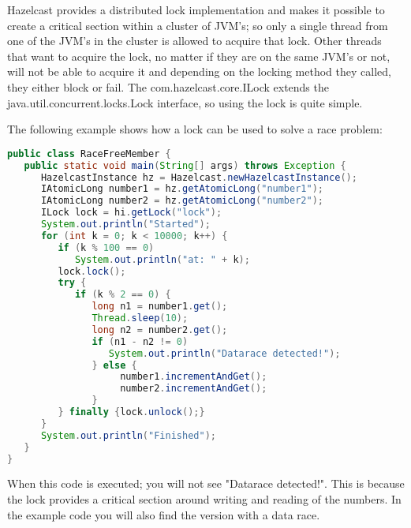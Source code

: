 Hazelcast provides a distributed lock implementation and makes it possible to create a critical section within a cluster of JVM's; so only a single thread from one of the JVM's in the cluster is allowed to acquire that lock. Other threads that want to acquire the lock, no matter if they are on the same JVM's or not, will not be able to acquire it and depending on the locking method they called, they either block or fail. The com.hazelcast.core.ILock extends the java.util.concurrent.locks.Lock interface, so using the lock is quite simple.

The following example shows how a lock can be used to solve a race problem:
\begin{lstlisting}[language=java]
public class RaceFreeMember {
   public static void main(String[] args) throws Exception {
      HazelcastInstance hz = Hazelcast.newHazelcastInstance();
      IAtomicLong number1 = hz.getAtomicLong("number1");
      IAtomicLong number2 = hz.getAtomicLong("number2");
      ILock lock = hi.getLock("lock");
      System.out.println("Started");
      for (int k = 0; k < 10000; k++) {
         if (k % 100 == 0) 
            System.out.println("at: " + k);
         lock.lock();
         try {
            if (k % 2 == 0) {
               long n1 = number1.get();
               Thread.sleep(10);
               long n2 = number2.get();
               if (n1 - n2 != 0) 
                  System.out.println("Datarace detected!");
               } else {
                    number1.incrementAndGet();
                    number2.incrementAndGet();
               }
         } finally {lock.unlock();}
      }
      System.out.println("Finished");
   }
}
\end{lstlisting}
When this code is executed; you will not see "Datarace detected!". This is because the lock provides a critical section around writing and reading of the numbers. In the example code you will also find the version with a data race.

